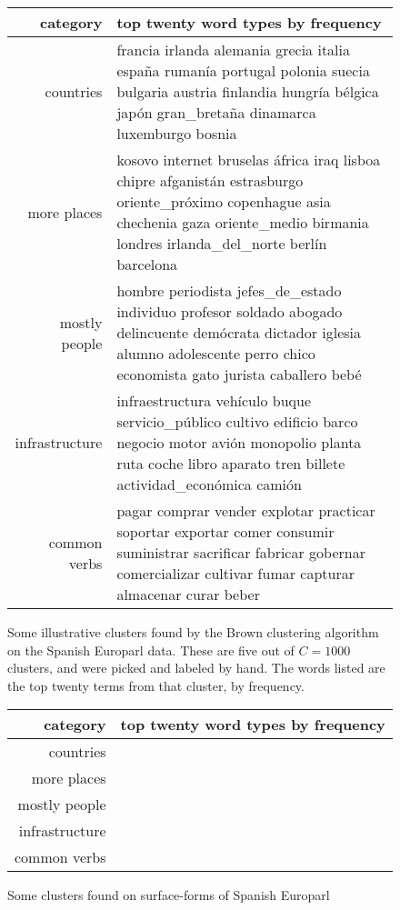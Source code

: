 \begin{figure*}[t!]
  \begin{tabular}{|r|p{10cm}|}
    \hline
    category  & top twenty word types by frequency \\
    \hline
    countries & francia irlanda alemania grecia italia españa rumanía portugal polonia suecia bulgaria austria finlandia hungría bélgica japón gran\_bretaña dinamarca luxemburgo bosnia \\
    \hline
    more places & kosovo internet bruselas áfrica iraq lisboa chipre afganistán estrasburgo oriente\_próximo copenhague asia chechenia gaza oriente\_medio birmania londres irlanda\_del\_norte berlín barcelona \\
    \hline
    mostly people & hombre periodista jefes\_de\_estado individuo profesor soldado abogado delincuente demócrata dictador iglesia alumno adolescente perro chico economista gato jurista caballero bebé \\
    \hline
    infrastructure & infraestructura vehículo buque servicio\_público cultivo edificio barco negocio motor avión monopolio planta ruta coche libro aparato tren billete actividad\_económica camión \\
    \hline
    common verbs & pagar comprar vender explotar practicar soportar exportar comer consumir suministrar sacrificar fabricar gobernar comercializar cultivar fumar capturar almacenar curar beber \\
    \hline
  \end{tabular}
\caption{Some illustrative clusters found by the Brown clustering algorithm on
the Spanish Europarl data. These are five out of $C=1000$ clusters, and
were picked and labeled by hand. The words listed are the
top twenty terms from that cluster, by frequency.}
\label{fig:clusters-europarl-lemma}
\end{figure*}

\begin{figure*}[t!]
  \begin{tabular}{|r|p{10cm}|}
    \hline
    category  & top twenty word types by frequency \\
    \hline
    countries &  \\
    \hline
    more places & \\
    \hline
    mostly people & \\
    \hline
    infrastructure & \\
    \hline
    common verbs & \\
    \hline
  \end{tabular}
\caption{Some clusters found on surface-forms of Spanish Europarl}
\label{fig:clusters-europarl-surface}
\end{figure*}

